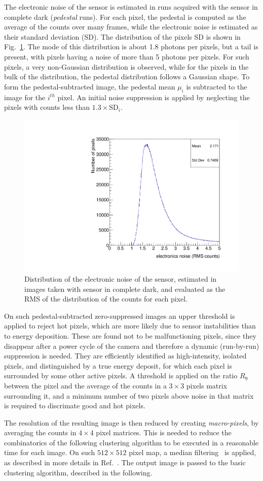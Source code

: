 The electronic noise of the sensor is estimated in runs acquired with
the sensor in complete dark ({\it pedestal} runs). For each pixel, the
pedestal is computed as the average of the counts over many frames,
while the electronic noise is estimated as their standard deviation
(SD). The distribution of the pixels SD is shown in
Fig.~\ref{fig:noise}. The mode of this distribution is about 1.8
photons per pixels, but a tail is present, with pixels having a noise
of more than 5 photons per pixels. For such pixels, a very
non-Gaussian distribution is observed, while for the pixels in the
bulk of the distribution, the pedestal distribution follows a Gaussian
shape. To form the pedestal-subtracted image, the pedestal mean
$\mu_i$ is subtracted to the image for the $i^{th}$ pixel.  An initial
noise suppression is applied by neglecting the pixels with counts less
than $1.3\times\textrm{SD}_i$.
%
\begin{figure}[ht]
  \centering
  \includegraphics[width=0.45\linewidth]{figures/sensor_noise}
  \caption{Distribution of the electronic noise of the sensor,
    estimated in images taken with sensor in complete dark, and
    evaluated as the RMS of the distribution of the counts for each
    pixel.  \label{fig:noise}}
\end{figure}
%
On such pedestal-subtracted zero-suppressed images an upper threshold
is applied to reject hot pixels, which are more likely due to sensor
instabilities than to energy deposition. These are found not to be
malfunctioning pixels, since they disappear after a power cycle of the
camera and therefore a dynamic (run-by-run) suppression is needed.
They are efficiently identified as high-intensity, isolated pixels,
and distinguished by a true energy deposit, for which each pixel is
surrounded by some other active pixels. A threshold is applied on the
ratio $R_9$ between the pixel and the average of the counts in a
$3\times3$ pixels matrix surrounding it, and a minimum number of two
pixels above noise in that matrix is required to discrimate good and
hot pixels.

The resolution of the resulting image is then reduced by creating
\textit{macro-pixels}, by averaging the counts in $4\times4$ pixel
matrices. This is needed to reduce the combinatorics   of the following
clustering algorithm to be executed   in a reasonable time for each
image. On such $512\times512$ pixel map, a median
filtering~\cite{medianfilter} is applied, as described in more details
in Ref.~\cite{medianfilter_cygno}. The output image is passed to the
basic clustering algorithm, described in the following.


